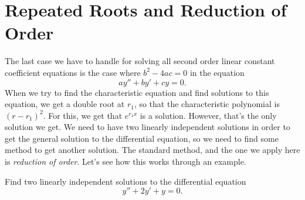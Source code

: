 \section{Repeated Roots and Reduction of Order}
\label{reproots:section}




The last case we have to handle for solving all second order linear constant coefficient equations is the case where $b^2 - 4ac = 0$ in the equation
\begin{equation*}
ay'' + by' + cy = 0.
\end{equation*}
When we try to find the characteristic equation and find solutions to this equation, we get a double root at $r_1$, so that the characteristic polynomial is $(r-r_1)^2$. For this, we get that $e^{r_1x}$ is a solution. However, that's the only solution we get. We need to have two linearly independent solutions in order to get the general solution to the differential equation, so we need to find some method to get another solution. The standard method, and the one we apply here is \emph{reduction of order}. Let's see how this works through an example.

\begin{example}
Find two linearly independent solutions to the differential equation
\begin{equation*}
y'' + 2y' + y = 0.
\end{equation*}
\end{example}

